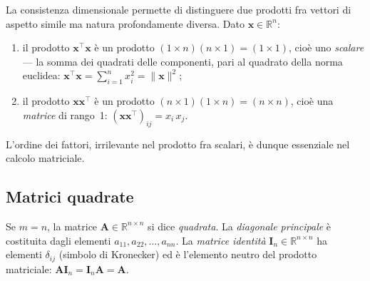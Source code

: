 \begin{oss}
	La consistenza dimensionale permette di distinguere due prodotti
	fra vettori di aspetto simile ma natura profondamente diversa. Dato
	$\bm{x}\in\mathbb{R}^n$:
	\begin{enumerate}[label=(\roman*)]
		\item il prodotto $\bm{x}^\top\bm{x}$ \`e un prodotto
		$(1\times n)(n\times 1) = (1\times 1)$, cio\`e uno
		\textit{scalare} --- la somma dei quadrati delle componenti,
		pari al quadrato della norma euclidea:
		$\bm{x}^\top\bm{x} = \sum_{i=1}^n x_i^2 = \|\bm{x}\|^2$;
		\item il prodotto $\bm{x}\bm{x}^\top$ \`e un prodotto
		$(n\times 1)(1\times n) = (n\times n)$, cio\`e una
		\textit{matrice} di rango~1:
		$(\bm{x}\bm{x}^\top)_{ij} = x_i\, x_j$.
	\end{enumerate}
	L'ordine dei fattori, irrilevante nel prodotto fra scalari,
	\`e dunque essenziale nel calcolo matriciale.
\end{oss}

\subsection{Matrici quadrate}\label{par:matrici_quadrate}

Se $m=n$, la matrice $\bm{A} \in \mathbb{R}^{n \times n}$ si dice \textit{quadrata}.
La \textit{diagonale principale} \`e costituita dagli elementi $a_{11}, a_{22},
\ldots, a_{nn}$. La \textit{matrice identit\`a} $\bm{I}_n \in \mathbb{R}^{n\times n}$
ha elementi $\delta_{ij}$ (simbolo di Kronecker) ed \`e l'elemento neutro del
prodotto matriciale: $\bm{A}\bm{I}_n = \bm{I}_n\bm{A} = \bm{A}$.


